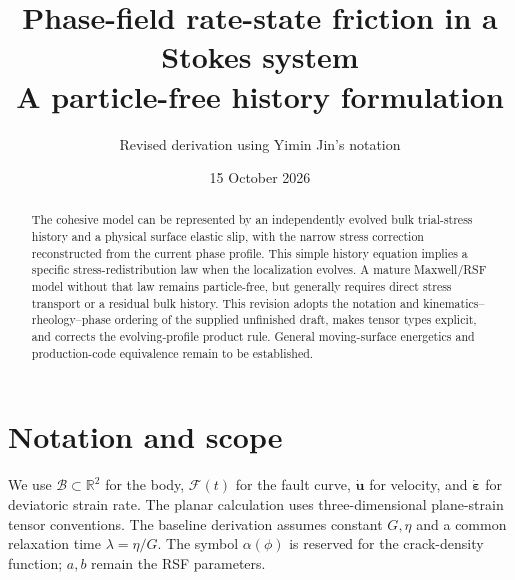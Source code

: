 \documentclass[10pt,letterpaper]{article}
\title{Phase-field rate-state friction in a Stokes system\\[4pt]\large A particle-free history formulation}
\author{Revised derivation using Yimin Jin's notation}
\date{15 October 2026}
\newcommand{\B}{\mathcal B}
\newcommand{\F}{\mathcal F}
\newcommand{\vel}{\dot{\bm u}}
\newcommand{\erate}{\dot{\bm\varepsilon}}
\begin{document}
\maketitle
\begin{abstract}
The cohesive model can be represented by an independently evolved bulk trial-stress history and a physical surface elastic slip, with the narrow stress correction reconstructed from the current phase profile. This simple history equation implies a specific stress-redistribution law when the localization evolves. A mature Maxwell/RSF model without that law remains particle-free, but generally requires direct stress transport or a residual bulk history. This revision adopts the notation and kinematics--rheology--phase ordering of the supplied unfinished draft, makes tensor types explicit, and corrects the evolving-profile product rule. General moving-surface energetics and production-code equivalence remain to be established.
\end{abstract}

\section{Notation and scope}
We use $\B\subset\mathbb R^2$ for the body, $\F(t)$ for the fault curve, $\vel$ for velocity, and $\erate$ for deviatoric strain rate. The planar calculation uses three-dimensional plane-strain tensor conventions. The baseline derivation assumes constant $G,\eta$ and a common relaxation time $\lambda=\eta/G$. The symbol $\alpha(\phi)$ is reserved for the crack-density function; $a,b$ remain the RSF parameters.
\end{document}
